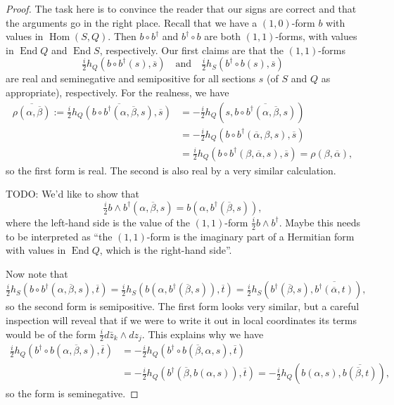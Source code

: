 \documentclass[10pt,a4paper]{amsart}
\theoremstyle{definition}
\def\qandq{\quad\text{and}\quad}
\def\ov#1{\overline{#1}}
\DeclareMathOperator{\End}{End}
\DeclareMathOperator{\Hom}{Hom}
\begin{document}
\begin{proof}
The task here is to convince the reader that our signs are correct and that the arguments go in the right place. Recall that we have a $(1,0)$-form $b$ with values in $\Hom(S,Q)$. Then $b \circ b^\dagger$ and $b^\dagger \circ b$ are both $(1,1)$-forms, with values in $\End Q$ and $\End S$, respectively. Our first claims are that the $(1,1)$-forms
\[
\tfrac i2 h_Q(b \circ b^\dagger(s), \ov s)
\qandq
\tfrac i2 h_S(b^\dagger \circ b(s), \ov s)
\]
are real and seminegative and semipositive for all sections $s$ (of $S$ and $Q$ as appropriate), respectively. For the realness, we have
\begin{align*}
\overline{\rho(\alpha, \ov\beta)}
:= \overline{\tfrac i2 h_Q(b \circ b^\dagger(\alpha, \ov\beta, s), \ov s)}
&= -\tfrac i2 h_Q(s, \ov{b \circ b^\dagger(\alpha,\ov\beta, s)})
\\
&= -\tfrac i2 h_Q(b \circ b^\dagger(\ov\alpha, \beta, s), \ov{s})
\\
&= \tfrac i2 h_Q(b \circ b^\dagger(\beta, \ov\alpha, s), \ov{s})
= \rho(\beta, \ov\alpha),
\end{align*}
so the first form is real. The second is also real by a very similar calculation.

TODO: We'd like to show that
\[
\tfrac i2 b \wedge b^\dagger (\alpha, \ov\beta, s)
= b(\alpha, b^\dagger(\ov\beta, s)),
\]
where the left-hand side is the value of the $(1,1)$-form $\frac i2 b \wedge b^\dagger$. Maybe this needs to be interpreted as ``the $(1,1)$-form is the imaginary part of a Hermitian form with values in $\End Q$, which is the right-hand side''.

Now note that
\[
\tfrac i2 h_S(b \circ b^\dagger(\alpha, \ov\beta, s), \ov t)
= \tfrac i2 h_S(b(\alpha, b^\dagger(\ov \beta, s)), \ov t)
= \tfrac i2 h_S(b^\dagger(\ov \beta, s), \ov{b^\dagger(\ov \alpha, t)}),
\]
so the second form is semipositive. The first form looks very similar, but a careful inspection will reveal that if we were to write it out in local coordinates its terms would be of the form $\frac i2 d\bar z_k \wedge dz_j$. This explains why we have
\begin{align*}
\tfrac i2 h_Q(b^\dagger \circ b(\alpha, \ov\beta, s), \ov t)
&= -\tfrac i2 h_Q(b^\dagger \circ b(\ov\beta, \alpha, s), \ov t)
\\
&= -\tfrac i2 h_Q(b^\dagger(\ov\beta, b(\alpha, s)), \ov t)
= -\tfrac i2 h_Q(b(\alpha, s), \ov{b(\ov\beta, t)}),
\end{align*}
so the form is seminegative.
\end{proof}
\end{document}
